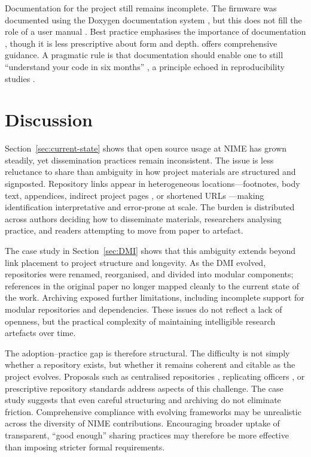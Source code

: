 Documentation for the project still remains incomplete.
The firmware was documented using the Doxygen documentation system \cite{beningo_documenting_2017}, but this does not fill the role of a user manual \cite{stallman_gnu_1992,procida_diataxis_2025}.
Best practice emphasises the importance of documentation \cite{smith_software_2016}, though it is less prescriptive about form and depth.
\citet{writethedocs_sowftware_2025} offers comprehensive guidance.
A pragmatic rule is that documentation should enable one to still ``understand your code in six months'' \cite{writethedocs_sowftware_2025}, a principle echoed
in reproducibility studies \cite{perkel_challenge_2020}.


\section{Discussion}

Section~\ref{sec:current-state} shows that open source usage at NIME has grown steadily, yet dissemination practices remain inconsistent. The issue is less reluctance to share than ambiguity in how project materials are structured and signposted. Repository links appear in heterogeneous locations---footnotes, body text, appendices, indirect project pages \cite{carter_sculpting_2025}, or shortened URLs \cite{nime2024_86}---making identification interpretative and error-prone at scale. The burden is distributed across authors deciding how to disseminate materials, researchers analysing practice, and readers attempting to move from paper to artefact.

The case study in Section~\ref{sec:DMI} shows that this ambiguity extends beyond link placement to project structure and longevity. As the DMI evolved, repositories were renamed, reorganised, and divided into modular components; references in the original paper no longer mapped cleanly to the current state of the work. Archiving exposed further limitations, including incomplete support for modular repositories and dependencies. These issues do not reflect a lack of openness, but the practical complexity of maintaining intelligible research artefacts over time.

The adoption--practice gap is therefore structural. The difficulty is not simply whether a repository exists, but whether it remains coherent and citable as the project evolves. Proposals such as centralised repositories \cite{mcpherson_nimehub_2016}, replicating officers \cite{calegario_documentation_2021}, or prescriptive repository standards \cite{fiordelmondo_towards_2025} address aspects of this challenge. The case study suggests that even careful structuring and archiving do not eliminate friction. Comprehensive compliance with evolving frameworks may be unrealistic across the diversity of NIME contributions. Encouraging broader uptake of transparent, ``good enough'' sharing practices \cite{jensenius_best_2021} may therefore be more effective than imposing stricter formal requirements.

